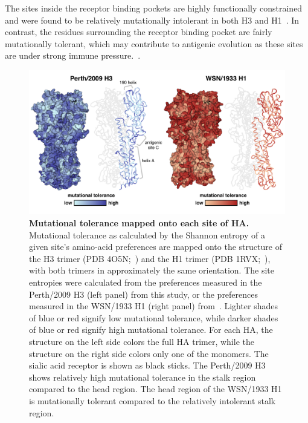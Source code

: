 \documentclass[11pt]{article}
\begin{document}
The sites inside the receptor binding pockets are highly functionally constrained and were found to be relatively mutationally intolerant in both H3 and H1~\citep{wilson1981structure}.
In contrast, the residues surrounding the receptor binding pocket are fairly mutationally tolerant, which may contribute to antigenic evolution as these sites are under strong immune pressure.~\citep{wiley1981structural}.

\begin{figure}
\centerline{\includegraphics[width=\textwidth]{figs/mut_tolerance/entropy_heatmap.pdf}}
\caption{\label{fig:mut_tolerance}
{\bf Mutational tolerance mapped onto each site of HA.}
Mutational tolerance as calculated by the Shannon entropy of a given site's amino-acid preferences are mapped onto the structure of the H3 trimer (PDB 4O5N;~\cite{lee2014receptor}) and the H1 trimer (PDB 1RVX;~\cite{gamblin2004structure}), with both trimers in approximately the same orientation. 
The site entropies were calculated from the preferences measured in the Perth/2009 H3 (left panel) from this study, or the preferences measured in the WSN/1933 H1 (right panel) from~\cite{doud2016accurate}. 
Lighter shades of blue or red signify low mutational tolerance, while darker shades of blue or red signify high mutational tolerance. 
For each HA, the structure on the left side colors the full HA trimer, while the structure on the right side colors only one of the monomers.
The sialic acid receptor is shown as black sticks.
The Perth/2009 H3 shows relatively high mutational tolerance in the stalk region compared to the head region. 
The head region of the WSN/1933 H1 is mutationally tolerant compared to the relatively intolerant stalk region. 
}
\end{figure}
\end{document}
